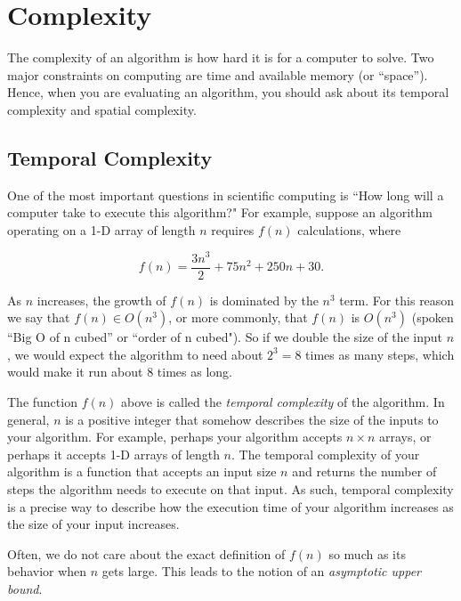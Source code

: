 

\section*{Complexity}
The complexity of an algorithm is how hard it is for a computer to solve. Two major constraints on computing are time and available memory (or ``space''). Hence, when you are evaluating an algorithm, you should ask about its temporal complexity and spatial complexity.

\subsection*{Temporal Complexity}
One of the most important questions in scientific computing is ``How long will a computer take to execute this algorithm?"
For example, suppose an algorithm operating on a 1-D array of length $n$ requires $f(n)$ calculations, where

\begin{equation*}
f(n) = \frac{3n^3}{2} + 75n^2 + 250n + 30.
\end{equation*}

As $n$ increases, the growth of $f(n)$ is dominated by the $n^3$ term.
For this reason we say that $f(n) \in O(n^3)$, or more commonly, that $f(n)$ is $O(n^3)$ (spoken ``Big O of n cubed'' or ``order of n cubed"). So if we double the size of the input $n$, we would expect the algorithm to need about $2^3=8$ times as many steps, which would make it run about 8 times as long.

The function $f(n)$ above is called the \emph{temporal complexity} of the algorithm. In general, $n$ is a positive integer that somehow describes the size of the inputs to your algorithm. For example, perhaps your algorithm accepts $n \times n$ arrays, or perhaps it accepts 1-D arrays of length $n$. The temporal complexity of your algorithm is a function that accepts an input size $n$ and returns the number of steps the algorithm needs to execute on that input. As such, temporal complexity is a precise way to describe how the execution time of your algorithm increases as the size of your input increases.

Often, we do not care about the exact definition of $f(n)$ so much as its behavior when $n$ gets large. This leads to the notion of an \emph{asymptotic upper bound}.


